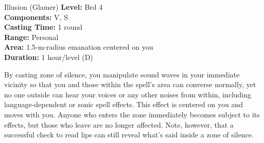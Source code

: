{Illusion (Glamer)}
{
	\textbf{Level:}
	Brd 4\\
	\textbf{Components:}
	V, S\\
	\textbf{Casting Time:}
	1 round\\
	\textbf{Range:}
	Personal\\
	\textbf{Area:}
	1.5-m-radius emanation centered on you\\
	\textbf{Duration:}
	1 hour/level (D)\\
}
{
	By casting zone of silence, you manipulate sound waves in your immediate vicinity so that you and those within the spell's area can converse normally, yet no one outside can hear your voices or any other noises from within, including language-dependent or sonic spell effects. This effect is centered on you and moves with you. Anyone who enters the zone immediately becomes subject to its effects, but those who leave are no longer affected. Note, however, that a successful  check to read lips can still reveal what's said inside a zone of silence.

}
